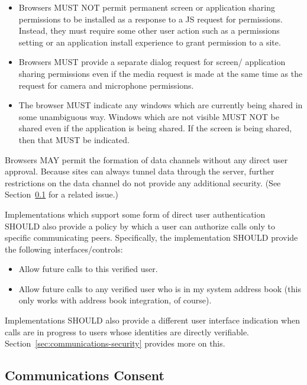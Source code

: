 \documentclass{article}
\begin{document}
\begin{itemize}
\item Browsers MUST NOT permit permanent screen or application sharing
  permissions to be installed as a response to a JS request for
  permissions.  Instead, they must require some other user action
  such as a permissions setting or an application install experience
  to grant permission to a site.

\item Browsers MUST provide a separate dialog request for screen/
  application sharing permissions even if the media request is made
  at the same time as the request for camera and microphone
  permissions.

\item The browser MUST indicate any windows which are currently being
  shared in some unambiguous way.  Windows which are not visible
  MUST NOT be shared even if the application is being shared.  If
  the screen is being shared, then that MUST be indicated.
\end{itemize}

Browsers MAY permit the formation of data channels without any direct
user approval.  Because sites can always tunnel data through the
server, further restrictions on the data channel do not provide any
additional security.  (See Section~\ref{sec:communications-consent} for a related issue.)

Implementations which support some form of direct user authentication
SHOULD also provide a policy by which a user can authorize calls only
to specific communicating peers.  Specifically, the implementation
SHOULD provide the following interfaces/controls:

\begin{itemize}
\item Allow future calls to this verified user.

\item Allow future calls to any verified user who is in my system
  address book (this only works with address book integration, of
  course).
\end{itemize}

Implementations SHOULD also provide a different user interface
indication when calls are in progress to users whose identities are
directly verifiable.  Section~\ref{sec:communications-security} provides more on this.

\subsection{Communications Consent}
\label{sec:communications-consent}
\end{document}
